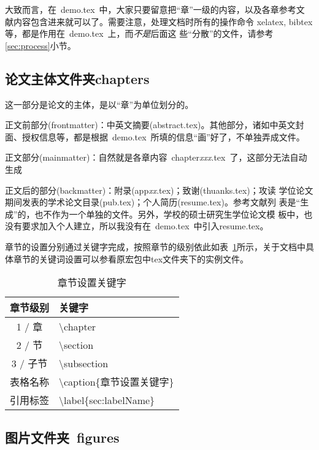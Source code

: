 大致而言，在~demo.tex~中，大家只要留意把``章''一级的内容，以及各章参考文
献内容包含进来就可以了。需要注意，处理文档时所有的操作命令
{}\cndash{}xelatex, bibtex等，都是作用在~demo.tex~上，而\emph{不是}后面这
些``分散''的文件，请参考\ref{sec:process}小节。

\subsection{论文主体文件夹chapters}
\label{sec:thesisbody}

这一部分是论文的主体，是以``章''为单位划分的。

正文前部分(frontmatter)：中英文摘要(abstract.tex)。其他部分，诸如中英文封
面、授权信息等，都是根据~demo.tex~所填的信息``画''好了，不单独弄成文件。

正文部分(mainmatter)：自然就是各章内容~chapter\emph{xxx}.tex~了，这部分无法自动生成

正文后的部分(backmatter)：附录(app\emph{xx}.tex)；致谢(thuanks.tex)；攻读
学位论文期间发表的学术论文目录(pub.tex)；个人简历(resume.tex)。参考文献列
表是``生成''的，也不作为一个单独的文件。另外，学校的硕士研究生学位论文模
板中，也没有要求加入个人建立，所以我没有在~demo.tex~中引入resume.tex。

章节的设置分别通过关键字完成，按照章节的级别依此如表~\ref{tab:setSection}所示，关于文档中具体章节的关键词设置可以参看原宏包中tex文件夹下的实例文件。


\begin{table}[htb]
 \centering
  \caption{章节设置关键字}     %
  \label{tab:setSection}    %
  \begin{tabular}{cl}
    \hline
    章节级别        & 关键字     \\
    \hline
    1 / 章        & \textbackslash chapter \\
    2 / 节        & \textbackslash section \\
    3 / 子节      & \textbackslash  subsection \\
    表格名称       & \textbackslash caption\{章节设置关键字\} \\
    引用标签       & \textbackslash label\{sec:labelName\} \\
    \hline
  \end{tabular}
\end{table}

\subsection{图片文件夹~figures}
\label{sec:figuresdir}

